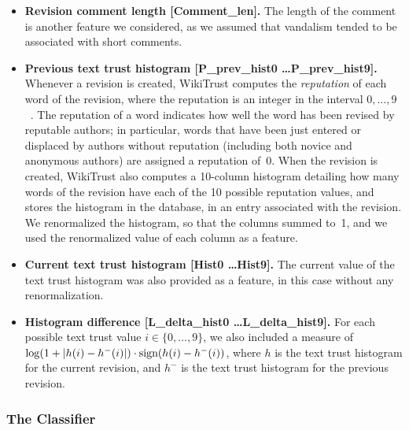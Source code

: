 \begin{itemize}
\item \textbf{Revision comment length [Comment\_len].}  The length of the comment is another feature we considered, as we assumed that vandalism tended to be associated with short comments.

\item \textbf{Previous text trust histogram [P\_prev\_hist0 \ldots P\_prev\_hist9].}
Whenever a revision is created, WikiTrust computes the {\em
reputation\/} of each word of the revision, where the reputation is an
integer in the interval $0, \ldots, 9$~\cite{Adler2008b}.
The reputation of a word indicates how well the word has been revised by reputable authors; in particular, words that have been just entered or displaced by authors without reputation (including both novice and anonymous authors) are assigned a reputation of~0.
When the revision is created, WikiTrust also computes a 10-column histogram detailing how many words of the revision have each of the 10 possible reputation values, and stores the histogram in the database, in an entry associated with the revision.
We renormalized the histogram, so that the columns summed to~1, and we used the renormalized value of each column as a feature.

\item \textbf{Current text trust histogram [Hist0 \ldots Hist9].}  The current value of the text trust histogram was also provided as a feature, in this case without any renormalization.

\item \textbf{Histogram difference [L\_delta\_hist0 \ldots L\_delta\_hist9].}  For each possible text trust value $i \in \{0, \ldots, 9\}$, we also included a measure of $\log(1 + |h(i) - h^{-}(i)|) \cdot {{\textrm{sign}}}(h(i) - h^{-}(i))$, where $h$ is the text trust histogram for the current revision, and $h^{-}$ is the text trust histogram for the previous revision.

\end{itemize}
%
\subsubsection{The Classifier}

